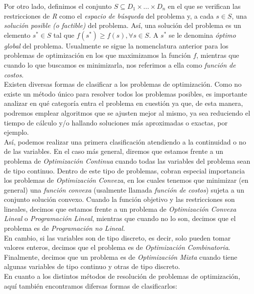 \documentclass[a4paper, 12pt, oneside]{book}
\begin{document}
	Por otro lado, definimos el conjunto $S\subseteq D_{1} \times ... \times D_{n}$ en el que se verifican las restricciones de \textit{R} como el \textit{espacio de b\'usqueda} del problema y, a cada $s\in S$, una \textit{soluci\'on posible (o factible)} del problema. As\'i, una soluci\'on del problema es un elemento $s^{*}\in S$ tal que $f(s^{*}) \geq f(s), \forall s \in S$. A $s^{*}$ se le denomina \textit{\'optimo global} del problema. Usualmente se sigue la nomenclatura anterior para los problemas de optimizaci\'on en los que maximizamos la funci\'on $f$, mientras que cuando lo que buscamos es minimizarla, nos referimos a ella como \textit{funci\'on de costos}.
	\\
	
	Existen diversas formas de clasificar a los problemas de optimizaci\'on. Como no existe un m\'etodo \'unico para resolver todos los problemas posibles, es importante analizar en qu\'e categor\'ia entra el problema en cuesti\'on ya que, de esta manera, podremos emplear algoritmos que se ajusten mejor al mismo, ya sea reduciendo el tiempo de c\'alculo y/o hallando soluciones m\'as aproximadas o exactas, por ejemplo.
	\\
	
	As\'i, podemos realizar una primera clasificaci\'on atendiendo a la continuidad o no de las variables. En el caso m\'as general, diremos que estamos frente a un problema de \textit{Optimizaci\'on Continua} cuando todas las variables del problema sean de tipo continuo. Dentro de este tipo de problemas, cobran especial importancia los problemas de \textit{Optimizaci\'on Conveza}, en los cuales tenemos que minimizar (en general) una \textit{funci\'on convexa} (usalmente llamada \textit{funci\'on de costos}) sujeta a un conjunto soluci\'on convexo. Cuando la funci\'on objetivo y las restricciones son lineales, decimos que estamos frente a un problema de \textit{Optimizaci\'on Convexa Lineal} o \textit{Programaci\'on Lineal}, mientras que cuando no lo son, decimos que el problema es de \textit{Programaci\'on no Lineal.}
	\\
	
	En cambio, si las variables son de tipo discreto, es decir, solo pueden tomar valores enteros, decimos que el problema es de \textit{Optimizaci\'on Combinatoria}. Finalmente, decimos que un problema es de \textit{Optimizaci\'on Mixta} cuando tiene algunas variables de tipo continuo y otras de tipo discreto.
	\\
	
	En cuanto a los distintos m\'etodos de resoluci\'on de problemas de optimizaci\'on, aqu\'i tambi\'en encontramos difersas formas de clasificarlos:
	
\end{document}
